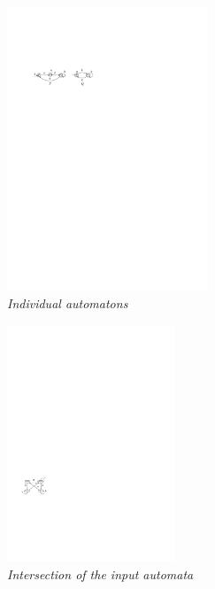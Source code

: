 \begin{figure}
\begin{center}
\includegraphics[width=60mm]{example_1.pdf}
\end{center}
\caption{{\em Individual automatons}} \label{fig1}
\end{figure}

 \begin{figure}
\begin{center}
\includegraphics[width=50mm]{product.pdf}
\end{center}
\caption{{\em Intersection of the input automata}}
\label{product}
\end{figure}
 
